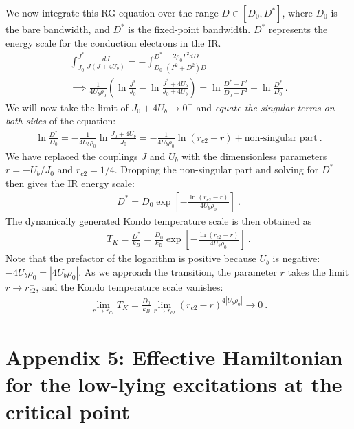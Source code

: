 We now integrate this RG equation over the range \(D \in \left[D_0, D^*\right] \), where \(D_0\) is the bare bandwidth, and \(D^*\) is the fixed-point bandwidth. \(D^*\) represents the energy scale for the conduction electrons in the IR.
\begin{eqnarray}
	\int_{J_0}^{J^*} \frac{d J}{J\left(J + 4U_b\right)} = -\int_{D_0}^{D^*}\frac{2\rho_0 \Gamma^2 d D}{\left( \Gamma^2 + D^2 \right) D} \nonumber\\
	\implies \frac{1}{4 U_b \rho_0} \left(\ln \frac{J^*}{J_0} - \ln \frac{J^* + 4U_b}{J_0 + 4 U_b}\right) = \ln \frac{D^* + \Gamma^2}{D_0 + \Gamma^2} - \ln \frac{D^*}{D_0}~.
\end{eqnarray}
We will now take the limit of \(J_0 + 4U_b \to 0^-\) and {\it equate the singular terms on both sides} of the equation:
\begin{eqnarray}
	\ln \frac{D^*}{D_0} = -\frac{1}{4 U_b \rho_0} \ln \frac{J_0 + 4 U_b}{J_0} = -\frac{1}{4 U_b \rho_0} \ln \left(r_{c2} - r\right) + \text{non-singular part}~.
\end{eqnarray}
We have replaced the couplings \(J\) and \(U_b\) with the dimensionless parameters \(r = -U_b/J_0\) and \(r_{c2} = 1/4\). Dropping the non-singular part and solving for \(D^*\) then gives the IR energy scale:
\begin{eqnarray}
	D^* = D_0 \exp\left[-\frac{\ln\left( r_{c2} - r \right)}{4 U_b \rho_0}\right]~.
\end{eqnarray}
The dynamically generated Kondo temperature scale is then obtained as
\begin{eqnarray}
	T_K = \frac{D^*}{k_B} = \frac{D_0}{k_B} \exp\left[-\frac{\ln\left( r_{c2} - r \right)}{4 U_b \rho_0}\right]~.
\end{eqnarray}
Note that the prefactor of the logarithm is positive because \(U_b\) is negative: \(-4U_b\rho_0 = |4U_b \rho_0|\). As we approach the transition, the parameter \(r\) takes the limit \(r \to r_{c2}^-\), and the Kondo temperature scale vanishes:
\begin{eqnarray}
	\lim_{r \to r_{c2}^-} T_K = \frac{D_0}{k_B} \lim_{r \to r_{c2}^-}\left(r_{c2} - r\right)^{4|U_b\rho_0|} \to 0~.
\end{eqnarray}


\section*{Appendix 5: Effective Hamiltonian for the low-lying excitations at the critical point}
\label{app-nfl}

